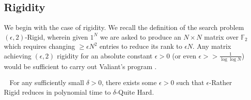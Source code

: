 \subsection{Rigidity}
We begin with the case of rigidity. We recall the definition of the search problem {\sc $(\epsilon,2)$-Rigid}, wherein given $1^N$ we are asked to produce an $N \times N$ matrix over $\mathbb{F}_2$ which requires changing $\geq \epsilon N^2$ entries to reduce its rank to $\epsilon N$. Any matrix achieving $(\epsilon,2)$ rigidity for an absolute constant $\epsilon >0$ (or even $\epsilon >> \frac{1}{\log \log N}$) would be sufficient to carry out Valiant's program \cite{Valiant}.



\begin{theorem}~\label{thm:rigidity-circuit}
For any sufficiently small $\delta > 0$, there exists some $\epsilon > 0$ such that {\sc $\epsilon$-Rather Rigid} reduces in polynomial time to {\sc $\delta$-Quite Hard}.
\end{theorem}

